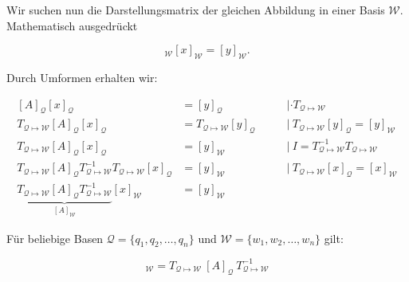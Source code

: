 Wir suchen nun die Darstellungsmatrix der gleichen Abbildung in einer Basis \( \mathcal{W} \). Mathematisch ausgedrückt

\begin{equation*}
    [A]_\mathcal{W} [x]_\mathcal{W} = [y]_\mathcal{W}.
\end{equation*}

Durch Umformen erhalten wir:

\begin{equation*}
    \begin{aligned}
        [A]_\mathcal{Q} [x]_\mathcal{Q} &= [y]_\mathcal{Q} &| \cdot T_{\mathcal{Q} \mapsto \mathcal{W}} \qquad \qquad \ \ \\[1em]
        T_{\mathcal{Q} \mapsto \mathcal{W}} [A]_\mathcal{Q} [x]_\mathcal{Q} &= T_{\mathcal{Q} \mapsto \mathcal{W}} [y]_\mathcal{Q} \qquad &| \ T_{\mathcal{Q} \mapsto \mathcal{W}} [y]_\mathcal{Q} = [y]_\mathcal{W} \, \\[1em]
        T_{\mathcal{Q} \mapsto \mathcal{W}} [A]_\mathcal{Q} [x]_\mathcal{Q} &= [y]_\mathcal{W} &| \ I = T_{\mathcal{Q} \mapsto \mathcal{W}}^{-1} T_{\mathcal{Q} \mapsto \mathcal{W}} \ \, \\[1em]
        T_{\mathcal{Q} \mapsto \mathcal{W}} [A]_\mathcal{Q} T_{\mathcal{Q} \mapsto \mathcal{W}}^{-1} T_{\mathcal{Q} \mapsto \mathcal{W}} [x]_\mathcal{Q} &= [y]_\mathcal{W} &| \ T_{\mathcal{Q} \mapsto \mathcal{W}} [x]_\mathcal{Q} = [x]_\mathcal{W} \\[1em] 
        \underbrace{T_{\mathcal{Q} \mapsto \mathcal{W}} [A]_\mathcal{Q} T_{\mathcal{Q} \mapsto \mathcal{W}}^{-1}}_{[A]_{\mathcal{W}}} [x]_\mathcal{W} &= [y]_\mathcal{W} &
    \end{aligned}
\end{equation*}

\vspace{1\baselineskip}

\begin{tcolorbox}[colback=gray!30, colframe=gray!80, title=Basiswechsel für Matrizen]
    Für beliebige Basen \( \mathcal{Q} = \{ q_1, q_2, \dots, q_n \} \) und \( \mathcal{W} = \{ w_1, w_2, \dots, w_n \} \) gilt:

    \begin{equation*}
        [A]_\mathcal{W} = T_{\mathcal{Q} \mapsto \mathcal{W}} \ [A]_\mathcal{Q} \ T_{\mathcal{Q} \mapsto \mathcal{W}}^{-1}
    \end{equation*}
\end{tcolorbox}

\newpage

